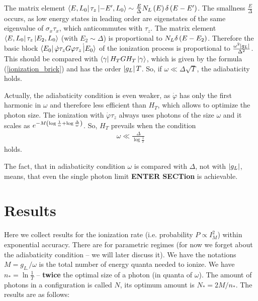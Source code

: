   The matrix element $ \bra{E,L_0}\tau_z\ket{-E', L_0} \sim\frac{E}{\Delta}
  N_L\left(E\right)\delta\left(E-E'\right)$. The smallness $ \frac{E}{\Delta} $ occurs, as low energy states in leading order are eigenstates  of the same eigenvalue of $ \sigma_x\tau_x $, which anticommutes with $ \tau_z $. The matrix element $ \bra{E,L_0}\tau_z\ket{E_2, L_0}$ (with $ E_2\sim \Delta $) is proportional to $ N_L \delta\left(E-E_2\right) $. Therefore the basic block $ \bra{E_0}\dot{\varphi}\tau_zG\dot{\varphi\tau_z\ket{E_0}}$ of the ionization process is proportional to $ \frac{\omega^2\left|g_L\right|}{\Delta^2} $. This should be compared with $ \bra{\gamma}H_T G H_T \ket{\gamma}$, which is given by the formula (\ref{ionization_brick}) and has the order $ \left|g_L\right|T $. So, if $ \omega\ll\Delta\sqrt{T} $, the adiabaticity holds.
  
  Actually, the adiabaticity condition is even weaker, as $ \dot{\varphi} $ has only the first harmonic in $ \omega $  and therefore less efficient than $ H_T $, which allows to optimize the photon size. The ionization with $ \dot{\varphi}\tau_z $ always uses photons of the size $ \omega $ and it scales as $ e^{-M\left(\log\frac{1}{\alpha}+\log\frac{\Delta}{\omega}\right)} $. So, $ H_T $ prevails when the condition
  \begin{gather}
  \omega
  	\ll \frac{\Delta}{\log\frac{1}{T}}
  \end{gather}
  holds.
  
  The fact, that in adiabaticity condition  $\omega  $ is compared with $ \Delta $, not with $ \left|g_L\right| $, means, that even the single photon limit \textbf{ENTER SECTion} is achievable. 
\section{Results}

Here we collect results for the ionization rate (i.e. probability
$P\propto I_{M}^{2}$) within exponential accuracy. There are for
parametric regimes (for now we forget about the adiabaticity condition
-- we will later discuss it). We have the notations $M=g_{L.}/\omega$
is the total number of energy quanta needed to ionize. We have $n_{*}=\ln\frac{1}{T}$
-- \textbf{twice} the optimal size of a photon (in quanta of $\omega$).
The amount of photons in a configuration is called $N$, its optimum
amount is $N_{*}=2M/n_{*}$. The results are as follows:

